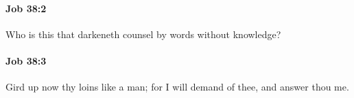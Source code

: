 		\paragraph{Job 38:2} %
			\label{JOB-38-2}

			Who is this that darkeneth counsel by words without knowledge?


		\paragraph{Job 38:3} %
			\label{JOB-38-3}

			Gird up now thy loins like a man; for I will demand of thee, and answer thou me.


